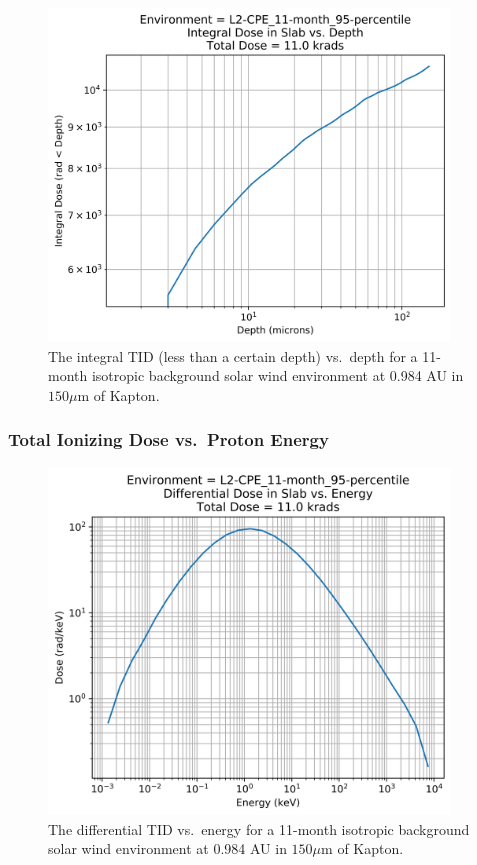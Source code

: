 \documentclass{hitec}
\begin{document}
\begin{figure}[htbp!]
	\centering
	\includegraphics[width=0.95\textwidth]{../L2-CPE_11-month_95-percentile_Integral_Dose_vs_Depth.png}
	\caption{The integral TID (less than a certain depth) vs.\ depth for a 11-month isotropic background solar wind environment at 0.984 AU in $150 \mu$m of Kapton.}\label{fig:L2-CPE_11-month_95-percentile_Integral_Dose_vs_Depth}
\end{figure}

\clearpage %


\subsubsection{Total Ionizing Dose vs.\ Proton Energy}
\label{sssec:TID-LowE-Dose vs Energy}

\begin{figure}[htbp!]
	\centering
	\includegraphics[width=0.95\textwidth]{../L2-CPE_11-month_95-percentile_Differential_Dose_vs_Energy.png}
	\caption{The differential TID vs.\ energy for a 11-month isotropic background solar wind environment at 0.984 AU in $150 \mu$m of Kapton.}\label{fig:L2-CPE_11-month_95-percentile_Differential_Dose_vs_Energy}
\end{figure}
\end{document}
